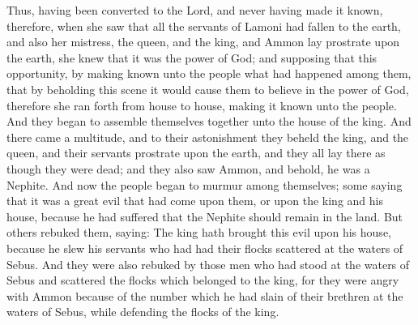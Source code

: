 Thus, having been converted to the Lord, and never having made it known, therefore, when she saw that all the servants of Lamoni had fallen to the earth, and also her mistress, the queen, and the king, and Ammon lay prostrate upon the earth, she knew that it was the power of God; and supposing that this opportunity, by making known unto the people what had happened among them, that by beholding this scene it would cause them to believe in the power of God, therefore she ran forth from house to house, making it known unto the people.
\bverse \iffalse And they began to assemble themselves together unto the house of the king. And there came a multitude, and to their astonishment they beheld the king, and the queen, and their servants prostrate upon the earth, and they all lay there as though they were dead; and they also saw Ammon, and behold, he was a Nephite. \fi
And they began to assemble themselves together unto the house of the king. And there came a multitude, and to their astonishment they beheld the king, and the queen, and their servants prostrate upon the earth, and they all lay there as though they were dead; and they also saw Ammon, and behold, he was a Nephite.
\bverse \iffalse And now the people began to murmur among themselves; some saying that it was a great evil that had come upon them, or upon the king and his house, because he had suffered that the Nephite should remain in the land. \fi
And now the people began to murmur among themselves; some saying that it was a great evil that had come upon them, or upon the king and his house, because he had suffered that the Nephite should remain in the land.
\bverse \iffalse But others rebuked them, saying: The king hath brought this evil upon his house, because he slew his servants who had had their flocks scattered at the waters of Sebus. \fi
But others rebuked them, saying: The king hath brought this evil upon his house, because he slew his servants who had had their flocks scattered at the waters of Sebus.
\bverse \iffalse And they were also rebuked by those men who had stood at the waters of Sebus and scattered the flocks which belonged to the king, for they were angry with Ammon because of the number which he had slain of their brethren at the waters of Sebus, while defending the flocks of the king. \fi
And they were also rebuked by those men who had stood at the waters of Sebus and scattered the flocks which belonged to the king, for they were angry with Ammon because of the number which he had slain of their brethren at the waters of Sebus, while defending the flocks of the king.

